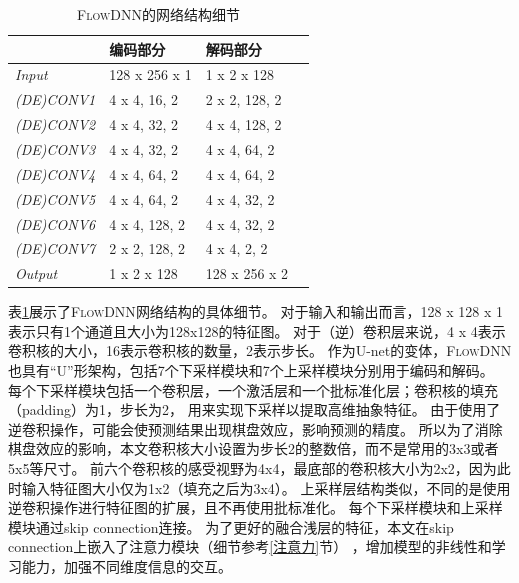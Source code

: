 \begin{table}[htp]
	\caption{
		\textsc{FlowDNN}的网络结构细节}
	\centering
	\begin{tabular}{p{3cm}p{3cm}p{3cm}p{3cm}}
		\toprule[0.4mm]
		& \multicolumn{1}{l}{编码部分} & \multicolumn{1}{l}{解码部分} \\
		\midrule
		
		\textit{Input}   & 128 x 256 x 1	& 1 x 2 x 128    \\
		\midrule
		\textit{(DE)CONV1}   &	4 x 4, 16, 2	& 2 x 2, 128, 2      	\\
		\textit{(DE)CONV2}   &	4 x 4, 32, 2	& 4 x 4, 128, 2    	\\
		\textit{(DE)CONV3}   &	4 x 4, 32, 2	& 4 x 4, 64, 2      \\
		\textit{(DE)CONV4}   &	4 x 4, 64, 2	& 4 x 4, 64, 2      \\
		\textit{(DE)CONV5}   &	4 x 4, 64, 2	& 4 x 4, 32, 2      \\
		\textit{(DE)CONV6}   &	4 x 4, 128, 2	& 4 x 4, 32, 2      \\
		\textit{(DE)CONV7}   &	2 x 2, 128, 2	& 4 x 4, 2, 2      \\

		\midrule
		\textit{Output}   & 	1 x 2 x 128		& 128 x 256 x 2      \\
		\bottomrule[0.4mm]
	\end{tabular}
	\label{tab:flowdnn}
\end{table}

表\ref{tab:flowdnn}展示了\textsc{FlowDNN}网络结构的具体细节。
对于输入和输出而言，128 x 128 x 1表示只有1个通道且大小为128x128的特征图。
对于（逆）卷积层来说，4 x 4表示卷积核的大小，16表示卷积核的数量，2表示步长。
作为U-net的变体，\textsc{FlowDNN}也具有“U”形架构，包括7个下采样模块和7个上采样模块分别用于编码和解码。
每个下采样模块包括一个卷积层，一个激活层和一个批标准化层；卷积核的填充（padding）为1，步长为2，
用来实现下采样以提取高维抽象特征。
由于使用了逆卷积操作，可能会使预测结果出现棋盘效应\cite{odena2016deconvolution}，影响预测的精度。
所以为了消除棋盘效应的影响，本文卷积核大小设置为步长2的整数倍，而不是常用的3x3或者5x5等尺寸。
前六个卷积核的感受视野为4x4，最底部的卷积核大小为2x2，因为此时输入特征图大小仅为1x2（填充之后为3x4）。
上采样层结构类似，不同的是使用逆卷积操作进行特征图的扩展，且不再使用批标准化。
每个下采样模块和上采样模块通过skip connection连接。
为了更好的融合浅层的特征，本文在skip connection上嵌入了注意力模块（细节参考\ref{注意力}节）
，增加模型的非线性和学习能力，加强不同维度信息的交互。



